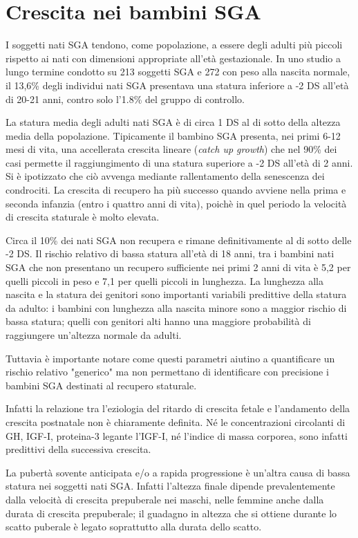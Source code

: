 \section{Crescita nei bambini SGA}

I soggetti nati SGA tendono, come popolazione, a essere degli adulti più piccoli
rispetto ai nati con dimensioni appropriate all'età gestazionale. In uno studio
a lungo termine condotto su 213 soggetti SGA e 272 con peso alla nascita normale, il 
13,6\% degli individui nati SGA presentava una statura inferiore a -2 DS all'età di
20-21 anni, contro solo l'1.8\% del gruppo di controllo.\cite{leger1997reduced}

La statura media degli adulti nati SGA è di circa 1 DS al di sotto della altezza 
media della popolazione. Tipicamente il bambino SGA presenta, nei primi 6-12 mesi
di vita, una accellerata crescita lineare (\textit{catch up growth}) che nel 90\%
dei casi permette il raggiungimento di una statura superiore a -2 DS all'età di
2 anni. %
Si è ipotizzato che ciò avvenga mediante rallentamento della senescenza dei condrociti.%
La crescita di recupero ha più successo quando avviene nella prima e seconda infanzia (entro i quattro anni di vita), poichè in quel periodo la velocità di crescita staturale è molto elevata. %

Circa il 10\% dei nati SGA non recupera e rimane definitivamente al di sotto delle -2 DS.
Il rischio relativo di bassa statura all'età di 18 anni, tra i bambini nati SGA
che non presentano un recupero sufficiente nei primi 2 anni di vita è 5,2 per quelli 
piccoli in peso e 7,1 per quelli piccoli in lunghezza.
La lunghezza alla nascita e la statura dei genitori sono importanti variabili predittive della statura da 
adulto: i bambini con lunghezza alla nascita minore sono a maggior rischio di bassa statura;
quelli con genitori alti hanno una maggiore probabilità di raggiungere
un'altezza normale da adulti.\cite{cianfarani2006hormonal}

Tuttavia è importante notare come questi parametri aiutino a quantificare un 
rischio relativo "generico" ma non permettano di identificare con precisione 
i bambini SGA destinati al recupero staturale.

Infatti la relazione tra l'eziologia del ritardo di crescita fetale e l'andamento della 
crescita postnatale non è chiaramente definita.
Né le concentrazioni circolanti di GH, IGF-I, proteina-3 legante l'IGF-I, n\'e l'indice
di massa corporea, sono infatti predittivi della successiva crescita.\cite{consensus}

La pubertà sovente anticipata e/o a rapida progressione è un'altra causa di bassa statura nei soggetti nati SGA. Infatti l'altezza finale dipende prevalentemente dalla velocità di crescita prepuberale nei maschi, nelle femmine anche dalla durata di crescita prepuberale; il guadagno in altezza che si ottiene durante lo scatto puberale è legato soprattutto alla durata dello scatto.%

